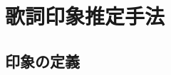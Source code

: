 \documentclass[a4paper,10pt,twocolumn]{jsarticle}
\begin{document}
\section{歌詞印象推定手法}
\subsection{印象の定義}


%
\end{document}
